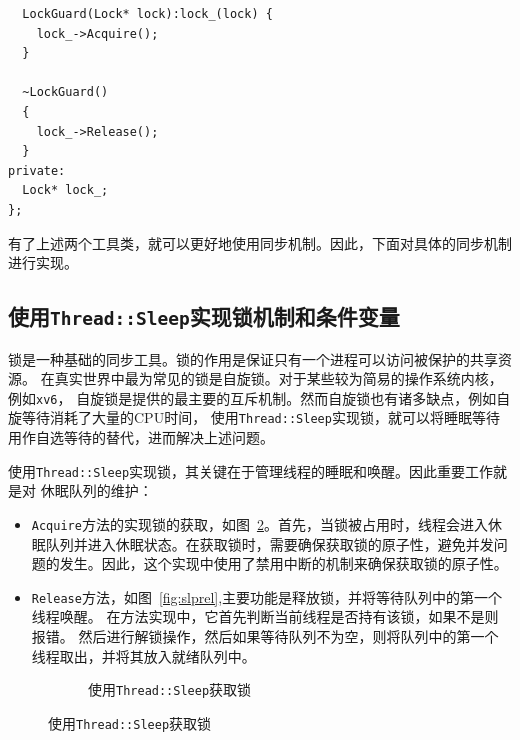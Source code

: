 \documentclass[a4paper,twoside]{article}
\begin{document}
\begin{spacing}{1.2}
\begin{listing}[htb]
\begin{verbatim}
  LockGuard(Lock* lock):lock_(lock) {
    lock_->Acquire();
  }

  ~LockGuard()
  {
    lock_->Release();
  }
private:
  Lock* lock_;
};
	\end{verbatim}
\end{listing}

有了上述两个工具类，就可以更好地使用同步机制。因此，下面对具体的同步机制进行实现。

\subsection{使用\texttt{Thread::Sleep}实现锁机制和条件变量}

锁是一种基础的同步工具。锁的作用是保证只有一个进程可以访问被保护的共享资源。
在真实世界中最为常见的锁是自旋锁。对于某些较为简易的操作系统内核，例如\texttt{xv6}，
自旋锁是提供的最主要的互斥机制。然而自旋锁也有诸多缺点，例如自旋等待消耗了大量的CPU时间，
使用\texttt{Thread::Sleep}实现锁，就可以将睡眠等待用作自选等待的替代，进而解决上述问题。

使用\texttt{Thread::Sleep}实现锁，其关键在于管理线程的睡眠和唤醒。因此重要工作就是对
休眠队列的维护：
\begin{itemize}
\item \texttt{Acquire}方法的实现锁的获取，如图~\ref*{fig:slpacq}。首先，当锁被占用时，线程会进入休眠队列并进入休眠状态。在获取锁时，需要确保获取锁的原子性，避免并发问题的发生。因此，这个实现中使用了禁用中断的机制来确保获取锁的原子性。
\item \texttt{Release}方法，如图~\ref*{fig:slprel},主要功能是释放锁，并将等待队列中的第一个线程唤醒。
在方法实现中，它首先判断当前线程是否持有该锁，如果不是则报错。
然后进行解锁操作，然后如果等待队列不为空，则将队列中的第一个线程取出，并将其放入就绪队列中。
\end{itemize}

\begin{figure}[h]
\centering
\caption{使用\texttt{Thread::Sleep}获取和释放锁}
\begin{subfigure}{0.4\textwidth}
	\centering
	\caption{使用\texttt{Thread::Sleep}获取锁}
	\label{fig:slpacq}
\end{subfigure}
\end{figure}
\end{spacing}
\end{document}
